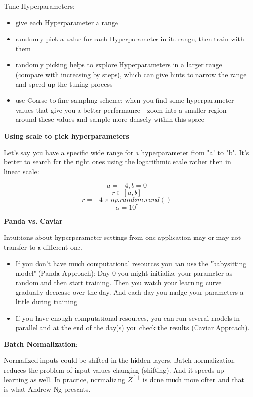 \documentclass{article}
\begin{document}
\noindent Tune Hyperparameters:

\begin{itemize}
    \item give each Hyperparameter a range
    \item randomly pick a value for each Hyperparameter in its range, then train with them
    \item randomly picking helps to explore Hyperparameters in a larger range (compare with increasing by steps), which can give hints to narrow the range and speed up the tuning process
    \item use Coarse to fine sampling scheme: when you find some hyperparameter values that give you a better performance - zoom into a smaller region around these values and sample more densely within this space
\end{itemize}

\noindent \textbf{Using scale to pick hyperparameters}

\noindent Let's say you have a specific wide range for a hyperparameter from "a" to "b". It's better to search for the right ones using the logarithmic scale rather then in linear scale:

\[a = -4, b = 0\]
\[r \in [a, b]\]
\[r = -4 \times np.random.rand()\]
\[\alpha = 10^{r}\]

\noindent \textbf{Panda vs. Caviar}

\noindent Intuitions about hyperparameter settings from one application may or may not transfer to a different one.

\begin{itemize}
    \item If you don't have much computational resources you can use the "babysitting model" (Panda Approach): Day 0 you might initialize your parameter as random and then start training. Then you watch your learning curve gradually decrease over the day. And each day you nudge your parameters a little during training.
    \item If you have enough computational resources, you can run several models in parallel and at the end of the day(s) you check the results (Caviar Approach).
\end{itemize}

\noindent \textbf{Batch Normalization}:

\noindent \noindent Normalized inputs could be shifted in the hidden layers. Batch normalization reduces the problem of input values changing (shifting). And it speeds up learning as well. In practice, normalizing \(Z^{[l]}\) is done much more often and that is what Andrew Ng presents.
\end{document}
